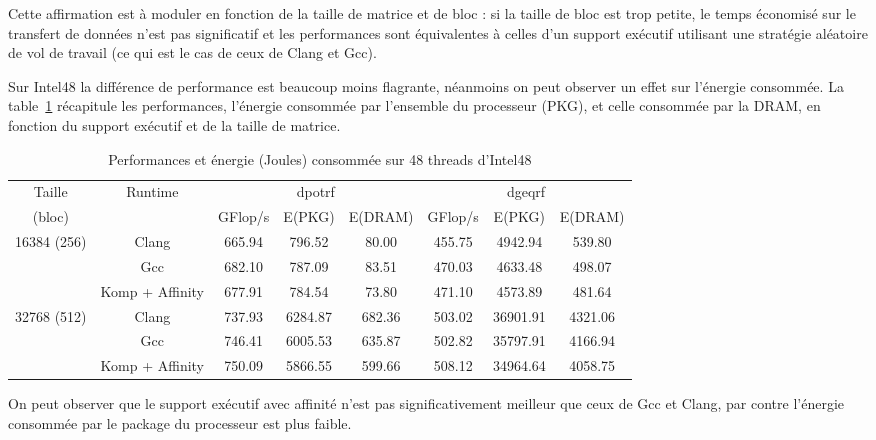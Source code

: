 \documentclass[parallelisme]{compas2017}
\begin{document}
Cette affirmation est à moduler en fonction de la taille de matrice et de bloc :
si la taille de bloc est trop petite, le temps économisé sur le transfert
de données n'est pas significatif et les performances sont équivalentes à celles d'un
support exécutif utilisant une stratégie aléatoire de vol de travail (ce qui est
le cas de ceux de Clang et Gcc).


Sur Intel48 la différence de performance est beaucoup moins flagrante, néanmoins
on peut observer un effet sur l'énergie consommée. La table~\ref{kastors_affinity_pkg}
récapitule les performances, l'énergie consommée par l'ensemble du processeur (PKG),
et celle consommée par la DRAM, en fonction du support exécutif et de la taille de matrice.

\begin{table}[!t]
  \caption{Performances et énergie (Joules) consommée sur 48 threads d'Intel48}
{\small
\label{kastors_affinity_pkg}
\centering
\begin{tabular}{|c|c|c|c|c|c|c|c|}
\hline
Taille& \multirow{2}{*}{Runtime} & \multicolumn{3}{c|}{dpotrf}  & \multicolumn{3}{c|}{dgeqrf}\\
                \cline{3-8}
                (bloc) & & GFlop/s &  E(PKG) & E(DRAM) & GFlop/s & E(PKG) & E(DRAM)\\
\hline
\multirow{3}{*}{16384 (256)}
&Clang           & 665.94 & 796.52  & 80.00 & 455.75 & 4942.94 & 539.80\\
&Gcc             & 682.10 & 787.09  & 83.51 & 470.03 & 4633.48 & 498.07\\
&Komp + Affinity & 677.91 & 784.54  & 73.80 & 471.10 & 4573.89 & 481.64\\
\hline
\multirow{3}{*}{32768 (512)}
&Clang           & 737.93 & 6284.87 & 682.36 & 503.02 & 36901.91 & 4321.06\\
&Gcc             & 746.41 & 6005.53 & 635.87 & 502.82 & 35797.91 & 4166.94\\
&Komp + Affinity & 750.09 & 5866.55 & 599.66 & 508.12 & 34964.64 & 4058.75\\
\hline
\end{tabular}
}
\end{table}

On peut observer que le support exécutif avec affinité n'est pas significativement meilleur
que ceux de Gcc et Clang, par contre l'énergie consommée par le package du processeur
est plus faible.
\end{document}
